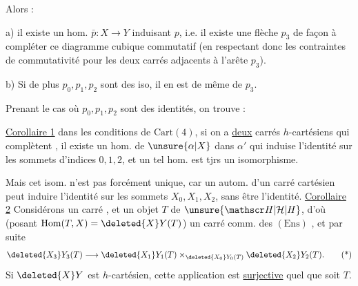 Alors :

a) il existe un hom. $\bar p:X\to Y$ induisant $p$, i.e. il existe une flèche $p_3$ de façon à compléter ce diagramme cubique commutatif (en respectant donc les contraintes de commutativité pour les deux carrés adjacents à l'arête $p_3$).

b) Si de plus $p_0,p_1,p_2$ sont des iso, il en est de même de $p_3$.

Prenant le cas où $p_0,p_1,p_2$ sont des identités, on trouve :

\uline{Corollaire 1} dans les conditions de $\mathrm{Cart}(4)$, si on a \uline{deux} carrés $h$-cartésiens  qui complètent
, il existe un hom. de $\unsure{\alpha|X}$ dans $\alpha'$ qui induise l'identité sur les sommets d'indices $0,1,2$, et un tel hom. est tjrs un isomorphisme.

Mais cet isom. n'est pas forcément unique, car   un autom. d'un carré  cartésien peut induire l'identité sur les sommets $X_0,X_1,X_2$, sans être l'identité.
\uline{Corollaire 2} Considérons un carré 
,
et un objet $T$ de $\unsure{\mathscr H|\mathcal H|H}$, d'où (posant $\operatorname{Hom}(T,X)=\deleted{X}Y(T)$) un carré comm. des $(\mathrm{Ens})$
, et par suite
\[
\deleted{X_3}Y_3(T)\longrightarrow \deleted{X_1}Y_1(T)\mathbin{\times}_{\deleted{X_0}Y_0(T)}\deleted{X_2}Y_2(T).\tag*{(*)}
\]
Si $\deleted{X}Y$ est $h$-cartésien, cette application \inserted{$(*)$} est \uline{surjective} quel que soit $T$. 

